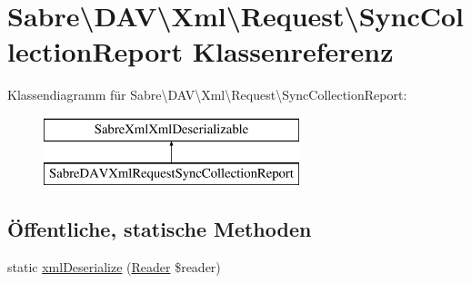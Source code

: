 \hypertarget{class_sabre_1_1_d_a_v_1_1_xml_1_1_request_1_1_sync_collection_report}{}\section{Sabre\textbackslash{}D\+AV\textbackslash{}Xml\textbackslash{}Request\textbackslash{}Sync\+Collection\+Report Klassenreferenz}
\label{class_sabre_1_1_d_a_v_1_1_xml_1_1_request_1_1_sync_collection_report}
Klassendiagramm für Sabre\textbackslash{}D\+AV\textbackslash{}Xml\textbackslash{}Request\textbackslash{}Sync\+Collection\+Report\+:\begin{figure}[H]
\begin{center}
\leavevmode
\includegraphics[height=2.000000cm]{class_sabre_1_1_d_a_v_1_1_xml_1_1_request_1_1_sync_collection_report}
\end{center}
\end{figure}
\subsection*{Öffentliche, statische Methoden}
\begin{DoxyCompactItemize}
\item 
static \mbox{\hyperlink{class_sabre_1_1_d_a_v_1_1_xml_1_1_request_1_1_sync_collection_report_a79e383048fca9256a4208c3da137a971}{xml\+Deserialize}} (\mbox{\hyperlink{class_sabre_1_1_xml_1_1_reader}{Reader}} \$reader)
\end{DoxyCompactItemize}
